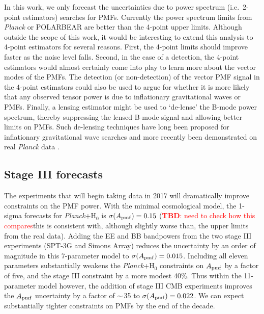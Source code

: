 \documentclass[apj]{emulateapj}
\newcommand{\apmf}{\ensuremath{A_{\rm pmf}}}
\newcommand{\lcdm}{\ensuremath{\Lambda}CDM}
\newcommand{\ho}{H\ensuremath{_0}}
\newcommand{\planck}{{\sl Planck}}
\newcommand{\sptnew}{SPT-3G}
\newcommand{\pb}{POLARBEAR}
\newcommand{\simons}{Simons Array}
\newcommand{\tbd}[1]{\textcolor{Red}{{\bf TBD}: #1}}
\begin{document}
In this work, we only forecast the uncertainties due to power spectrum (i.e.~2-point estimators) searches for PMFs. 
Currently the power spectrum limits from \planck{} or \pb{} are better than the 4-point upper limits. 
Although outside the scope of this work, it would be interesting to extend this analysis to 4-point estimators for several reasons. 
First, the 4-point limits should improve faster as the noise level falls. 
Second, in the case of a detection, the 4-point estimators would almost certainly come into play to learn more about the vector modes of the PMFs. 
The detection (or non-detection) of the vector PMF signal in the 4-point estimators could also be used to argue for whether it is more likely that any observed tensor power is due to  inflationary gravitational waves or  PMFs. 
Finally, a lensing estimator might be used to `de-lense' the B-mode power spectrum, thereby suppressing the lensed B-mode signal and allowing better limits on PMFs. 
Such de-lensing techniques have long been proposed for inflationary gravitational wave searches \citep[e.g.][]{knox02,kesden02,seljak04a,simard15} and more recently been demonstrated on real \planck{} data \citep{larsen16}. 


\subsection{Stage III forecasts}

The experiments that will begin taking data in 2017 will dramatically improve constraints on the PMF power. 
With the minimal cosmological model, the 1-sigma forecasts for \planck{}+\ho{} is $\sigma(\apmf)=0.15$ (\tbd{need to check how this compares}this is consistent with, although slightly worse than, the upper limits from the real data).  
Adding the EE and BB bandpowers from the two stage III experiments (\sptnew{} and \simons{}) reduces the uncertainty by an order of magnitude in this 7-parameter model to $\sigma(\apmf)=0.015$. 
Including all eleven parameters substantially weakens the \planck+\ho{} constraints on \apmf{} by a factor of five, and the stage III constraint by a more modest 40\%. 
Thus within the 11-parameter model however,  the addition of stage III CMB experiments improves the \apmf{} uncertainty by a factor of $\sim$\,35 to  $\sigma(\apmf)=0.022$. 
We can expect substantially tighter constraints on PMFs by the end of the decade. 
\end{document}
